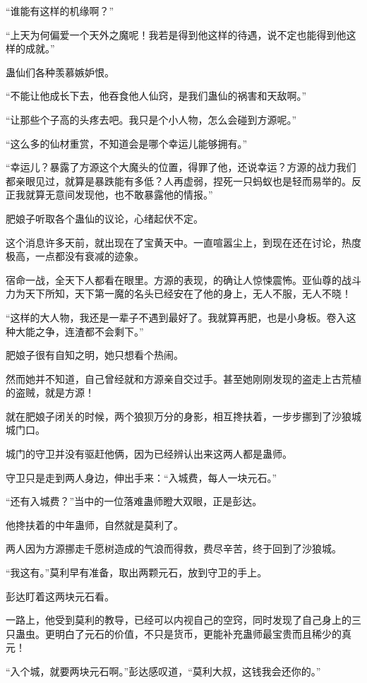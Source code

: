 \begin{this_body}
“谁能有这样的机缘啊？”

“上天为何偏爱一个天外之魔呢！我若是得到他这样的待遇，说不定也能得到他这样的成就。”

蛊仙们各种羡慕嫉妒恨。

“不能让他成长下去，他吞食他人仙窍，是我们蛊仙的祸害和天敌啊。”

“让那些个子高的头疼去吧。我只是个小人物，怎么会碰到方源呢。”

“这么多的仙材重赏，不知道会是哪个幸运儿能够拥有。”

“幸运儿？暴露了方源这个大魔头的位置，得罪了他，还说幸运？方源的战力我们都亲眼见过，就算是暴跌能有多低？人再虚弱，捏死一只蚂蚁也是轻而易举的。反正我就算无意间发现他，也不敢暴露他的情报。”

肥娘子听取各个蛊仙的议论，心绪起伏不定。

这个消息许多天前，就出现在了宝黄天中。一直喧嚣尘上，到现在还在讨论，热度极高，一点都没有衰减的迹象。

宿命一战，全天下人都看在眼里。方源的表现，的确让人惊悚震怖。亚仙尊的战斗力为天下所知，天下第一魔的名头已经安在了他的身上，无人不服，无人不晓！

“这样的大人物，我还是一辈子不遇到最好了。我就算再肥，也是小身板。卷入这种大能之争，连渣都不会剩下。”

肥娘子很有自知之明，她只想看个热闹。

然而她并不知道，自己曾经就和方源亲自交过手。甚至她刚刚发现的盗走上古荒植的盗贼，就是方源！

就在肥娘子闭关的时候，两个狼狈万分的身影，相互搀扶着，一步步挪到了沙狼城城门口。

城门的守卫并没有驱赶他俩，因为已经辨认出来这两人都是蛊师。

守卫只是走到两人身边，伸出手来：“入城费，每人一块元石。”

“还有入城费？”当中的一位落难蛊师瞪大双眼，正是彭达。

他搀扶着的中年蛊师，自然就是莫利了。

两人因为方源挪走千愿树造成的气浪而得救，费尽辛苦，终于回到了沙狼城。

“我这有。”莫利早有准备，取出两颗元石，放到守卫的手上。

彭达盯着这两块元石看。

一路上，他受到莫利的教导，已经可以内视自己的空窍，同时发现了自己身上的三只蛊虫。更明白了元石的价值，不只是货币，更能补充蛊师最宝贵而且稀少的真元！

“入个城，就要两块元石啊。”彭达感叹道，“莫利大叔，这钱我会还你的。”


\end{this_body}
